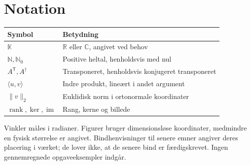 \documentclass[11pt,a4paper,oneside]{book}
\begin{document}
\section*{Notation}
\begin{tabular}{@{}lp{}@{}}
\toprule
Symbol & Betydning\\\midrule
$\mathbb K$ & $\mathbb R$ eller $\mathbb C$, angivet ved behov\\
$\mathbb N,\mathbb N_0$ & Positive heltal, henholdsvis med nul\\
$A^{\mathsf T},A^\dagger$ & Transponeret, henholdsvis konjugeret transponeret\\
$\langle u,v\rangle$ & Indre produkt, lineært i andet argument\\
$\|v\|_2$ & Euklidisk norm i ortonormale koordinater\\
$\operatorname{rank},\ker,\operatorname{im}$ & Rang, kerne og billede\\
\bottomrule
\end{tabular}

Vinkler måles i radianer. Figurer bruger dimensionsløse koordinater,
medmindre en fysisk størrelse er angivet. Bindhenvisninger til senere
emner angiver deres placering i værket; de lover ikke, at de senere bind
er færdigskrevet. Ingen gennemregnede opgaveeksempler indgår.

\begingroup\small\tableofcontents\endgroup
\mainmatter



\backmatter
\formelregister
\end{document}
